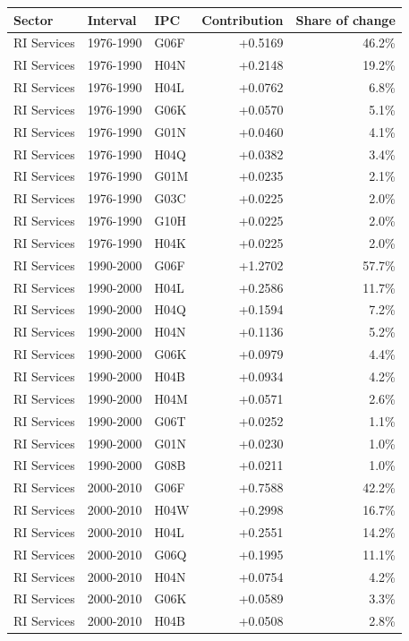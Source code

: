 \begin{tabular}{lllrr}
\toprule
Sector & Interval & IPC & Contribution & Share of change \\
\midrule
RI Services & 1976-1990 & G06F & +0.5169 & 46.2\% \\
RI Services & 1976-1990 & H04N & +0.2148 & 19.2\% \\
RI Services & 1976-1990 & H04L & +0.0762 & 6.8\% \\
RI Services & 1976-1990 & G06K & +0.0570 & 5.1\% \\
RI Services & 1976-1990 & G01N & +0.0460 & 4.1\% \\
RI Services & 1976-1990 & H04Q & +0.0382 & 3.4\% \\
RI Services & 1976-1990 & G01M & +0.0235 & 2.1\% \\
RI Services & 1976-1990 & G03C & +0.0225 & 2.0\% \\
RI Services & 1976-1990 & G10H & +0.0225 & 2.0\% \\
RI Services & 1976-1990 & H04K & +0.0225 & 2.0\% \\
RI Services & 1990-2000 & G06F & +1.2702 & 57.7\% \\
RI Services & 1990-2000 & H04L & +0.2586 & 11.7\% \\
RI Services & 1990-2000 & H04Q & +0.1594 & 7.2\% \\
RI Services & 1990-2000 & H04N & +0.1136 & 5.2\% \\
RI Services & 1990-2000 & G06K & +0.0979 & 4.4\% \\
RI Services & 1990-2000 & H04B & +0.0934 & 4.2\% \\
RI Services & 1990-2000 & H04M & +0.0571 & 2.6\% \\
RI Services & 1990-2000 & G06T & +0.0252 & 1.1\% \\
RI Services & 1990-2000 & G01N & +0.0230 & 1.0\% \\
RI Services & 1990-2000 & G08B & +0.0211 & 1.0\% \\
RI Services & 2000-2010 & G06F & +0.7588 & 42.2\% \\
RI Services & 2000-2010 & H04W & +0.2998 & 16.7\% \\
RI Services & 2000-2010 & H04L & +0.2551 & 14.2\% \\
RI Services & 2000-2010 & G06Q & +0.1995 & 11.1\% \\
RI Services & 2000-2010 & H04N & +0.0754 & 4.2\% \\
RI Services & 2000-2010 & G06K & +0.0589 & 3.3\% \\
RI Services & 2000-2010 & H04B & +0.0508 & 2.8\% \\

\end{tabular}
